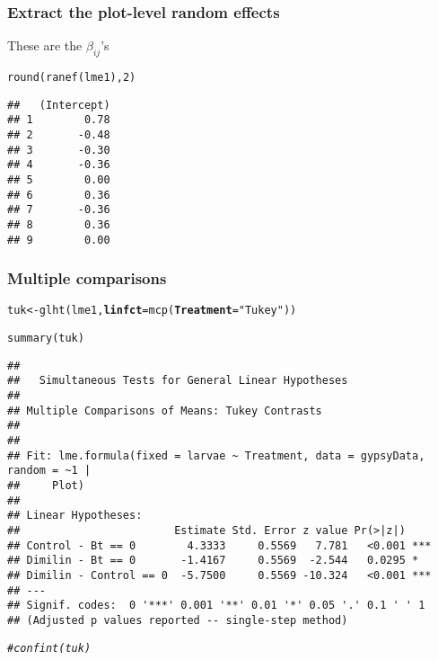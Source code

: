 \documentclass[color=usenames,dvipsnames]{beamer}\usepackage[]{graphicx}\usepackage[]{color}
\makeatletter
\newcommand{\hlnum}[1]{\textcolor[rgb]{0.69,0.494,0}{#1}}%
\newcommand{\hlstr}[1]{\textcolor[rgb]{0.749,0.012,0.012}{#1}}%
\newcommand{\hlcom}[1]{\textcolor[rgb]{0.514,0.506,0.514}{\textit{#1}}}%
\newcommand{\hlstd}[1]{\textcolor[rgb]{0,0,0}{#1}}%
\newcommand{\hlkwb}[1]{\textcolor[rgb]{0,0.341,0.682}{#1}}%
\newcommand{\hlkwc}[1]{\textcolor[rgb]{0,0,0}{\textbf{#1}}}%
\newcommand{\hlkwd}[1]{\textcolor[rgb]{0.004,0.004,0.506}{#1}}%
\newenvironment{kframe}{%
 \def\at@end@of@kframe{}%
 \ifinner\ifhmode%
  \def\at@end@of@kframe{\end{minipage}}%
  \begin{minipage}{\columnwidth}%
 \fi\fi%
 \def\FrameCommand##1{\hskip\@totalleftmargin \hskip-\fboxsep
 \colorbox{shadecolor}{##1}\hskip-\fboxsep
     \hskip-\linewidth \hskip-\@totalleftmargin \hskip\columnwidth}%
 \MakeFramed {\advance\hsize-\width
   \@totalleftmargin\z@ \linewidth\hsize
   \@setminipage}}%
 {\par\unskip\endMakeFramed%
 \at@end@of@kframe}
\newenvironment{knitrout}{}{} %
\makeatother
\begin{document}
\begin{frame}[fragile]
  \frametitle{Extract the plot-level random effects}
  {%
    These are the $\beta_{ij}$'s}
\begin{knitrout}
\color{fgcolor}\begin{kframe}
\begin{alltt}
\hlkwd{round}\hlstd{(}\hlkwd{ranef}\hlstd{(lme1),} \hlnum{2}\hlstd{)}
\end{alltt}
\begin{verbatim}
##   (Intercept)
## 1        0.78
## 2       -0.48
## 3       -0.30
## 4       -0.36
## 5        0.00
## 6        0.36
## 7       -0.36
## 8        0.36
## 9        0.00
\end{verbatim}
\end{kframe}
\end{knitrout}
\end{frame}



\begin{frame}[fragile]
  \frametitle{Multiple comparisons}
\begin{knitrout}\scriptsize
{}\color{fgcolor}\begin{kframe}
\begin{alltt}
\hlstd{tuk} \hlkwb{<-} \hlkwd{glht}\hlstd{(lme1,} \hlkwc{linfct}\hlstd{=}\hlkwd{mcp}\hlstd{(}\hlkwc{Treatment}\hlstd{=}\hlstr{"Tukey"}\hlstd{))}
\end{alltt}
\end{kframe}
\end{knitrout}
\pause
\begin{knitrout}\scriptsize
{}\color{fgcolor}\begin{kframe}
\begin{alltt}
\hlkwd{summary}\hlstd{(tuk)}
\end{alltt}
\begin{verbatim}
## 
## 	 Simultaneous Tests for General Linear Hypotheses
## 
## Multiple Comparisons of Means: Tukey Contrasts
## 
## 
## Fit: lme.formula(fixed = larvae ~ Treatment, data = gypsyData, random = ~1 | 
##     Plot)
## 
## Linear Hypotheses:
##                        Estimate Std. Error z value Pr(>|z|)    
## Control - Bt == 0        4.3333     0.5569   7.781   <0.001 ***
## Dimilin - Bt == 0       -1.4167     0.5569  -2.544   0.0295 *  
## Dimilin - Control == 0  -5.7500     0.5569 -10.324   <0.001 ***
## ---
## Signif. codes:  0 '***' 0.001 '**' 0.01 '*' 0.05 '.' 0.1 ' ' 1
## (Adjusted p values reported -- single-step method)
\end{verbatim}
\begin{alltt}
\hlcom{#confint(tuk)}
\end{alltt}
\end{kframe}
\end{knitrout}
\end{frame}
\end{document}
